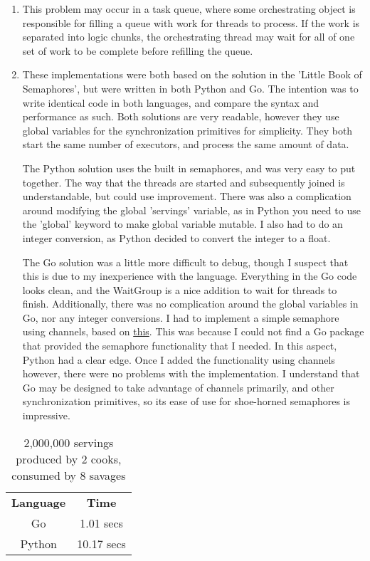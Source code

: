 \documentclass[a4paper,10pt]{article}
\begin{document}
\begin{enumerate}
    \item This problem may occur in a task queue, where some orchestrating object is responsible for filling a queue with work for threads to process. If the work is separated into logic chunks, the orchestrating thread may wait for all of one set of work to be complete before refilling the queue.
    \item These implementations were both based on the solution in the 'Little Book of Semaphores', but were written in both Python and Go. The intention was to write identical code in both languages, and compare the syntax and performance as such. Both solutions are very readable, however they use global variables for the synchronization primitives for simplicity. They both start the same number of executors, and process the same amount of data.
    
    The Python solution uses the built in semaphores, and was very easy to put together. The way that the threads are started and subsequently joined is understandable, but could use improvement. There was also a complication around modifying the global 'servings' variable, as in Python you need to use the 'global' keyword to make global variable mutable. I also had to do an integer conversion, as Python decided to convert the integer to a float.
    
    The Go solution was a little more difficult to debug, though I suspect that this is due to my inexperience with the language. Everything in the Go code looks clean, and the WaitGroup is a nice addition to wait for threads to finish. Additionally, there was no complication around the global variables in Go, nor any integer conversions. I had to implement a simple semaphore using channels, based on \href{http://www.golangpatterns.info/concurrency/semaphores}{this}. This was because I could not find a Go package that provided the semaphore functionality that I needed. In this aspect, Python had a clear edge. Once I added the functionality using channels however, there were no problems with the implementation. I understand that Go may be designed to take advantage of channels primarily, and other synchronization primitives, so its ease of use for shoe-horned semaphores is impressive.
\end{enumerate}

\begin{table}[h]
    \centering
    \begin{tabular}{cc}
        \textbf{Language} & \textbf{Time}\\
        Go & 1.01 secs\\
        Python & 10.17 secs
    \end{tabular}
    \caption{2,000,000 servings produced by 2 cooks, consumed by 8 savages}
\end{table}
\end{document}
